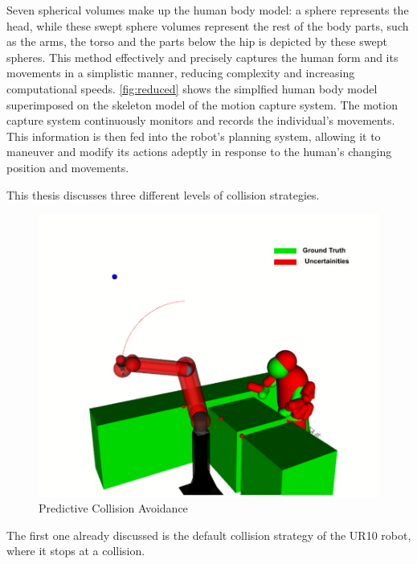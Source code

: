 Seven spherical volumes make up the human body model: a sphere represents the head, while these swept sphere volumes represent the rest of the body parts, such as the arms, the torso and the parts below the hip is depicted by these swept spheres. This method effectively and precisely captures the human form and its movements in a simplistic manner, reducing complexity and increasing computational speeds. 
\autoref{fig:reduced} shows the simplfied human body model superimposed on the skeleton model of the motion capture system.
The motion capture system continuously monitors and records the individual's movements. This information is then fed into the robot's planning system, allowing it to maneuver and modify its actions adeptly in response to the human's changing position and movements.

This thesis discusses three different levels of collision strategies.

\begin{figure}[!htbp]
	\centering
	\includegraphics[width=0.8\columnwidth]{images/uncertainities (1).pdf}
	\caption{Predictive Collision Avoidance}
	\label{fig:pred}
\end{figure}

The first one already discussed is the default collision strategy of the UR10 robot, where it stops at a collision.

